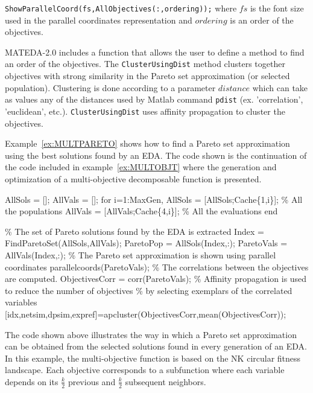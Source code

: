 \documentclass[a4paper]{article}
\begin{document}
 \texttt{ShowParallelCoord(fs,AllObjectives(:,ordering));}
where $fs$ is the font size used in the parallel coordinates
representation and $ordering$ is an order of the objectives.

MATEDA-2.0 includes a function that allows the user to define a
method to find an  order of the objectives. The
\texttt{ClusterUsingDist} method clusters together objectives with
strong similarity in the Pareto set approximation (or selected
population). Clustering is done according to a parameter $distance$
which can take as values  any of the distances used by Matlab
command \texttt{pdist} (ex. 'correlation', 'euclidean', etc.).
\texttt{ClusterUsingDist} uses affinity propagation
\cite{Frey_and_Dueck:2007}  to cluster the objectives.

Example~\ref{ex:MULTPARETO} shows how to find a Pareto set
approximation using the best solutions found by an EDA. The code
shown is the continuation of the code included  in
example~\ref{ex:MULTOBJT} where the generation and optimization of a
multi-objective decomposable function is presented.

\begin{example}
 \begin{programf}
  AllSols = [];
  AllVals = [];
 for i=1:MaxGen,
  AllSols = [AllSols;Cache\{1,i\}];   \% All the populations
  AllVals = [AllVals;Cache\{4,i\}];   \% All the evaluations
 end

 \% The set of Pareto solutions found by the EDA is extracted
 Index = FindParetoSet(AllSols,AllVals);
 ParetoPop = AllSols(Index,:);
 ParetoVals = AllVals(Index,:);
 \% The Pareto set approximation is shown using parallel coordinates
 parallelcoords(ParetoVals);
  \% The correlations between the objectives are computed.
 ObjectivesCorr = corr(ParetoVals);
  \% Affinity propagation is used to reduce the number of objectives
  \% by selecting exemplars of the correlated variables
 [idx,netsim,dpsim,expref]=apcluster(ObjectivesCorr,mean(ObjectivesCorr)); \end{programf}
 \label{ex:MULTPARETO} \end{example}


 The code shown above illustrates the way in which  a Pareto set approximation
 can be obtained from the selected solutions found in every generation of an EDA.
 In this example, the
 multi-objective function is based on the NK circular fitness landscape. Each objective
 corresponds to a subfunction where each
variable depends on its $\frac{k}{2}$  previous and $\frac{k}{2}$
subsequent neighbors.
\end{document}
